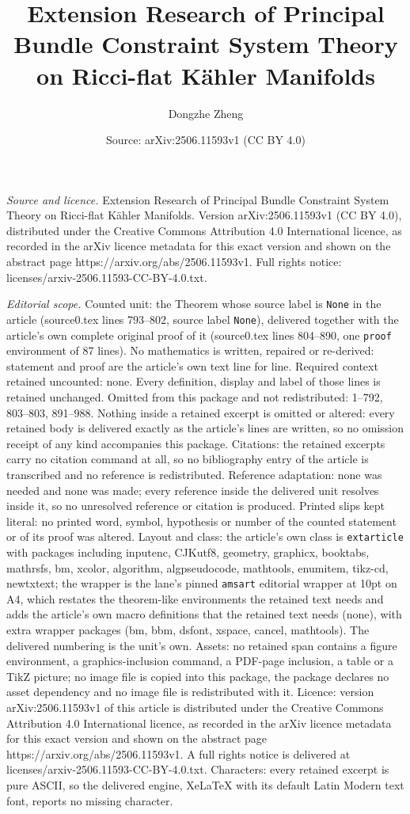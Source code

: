 \documentclass[10pt,a4paper]{amsart}
\title[Extension Research of Principal Bundle Constraint System The]{Extension Research of Principal Bundle Constraint System Theory on Ricci-flat K\"ahler Manifolds}
\author{Dongzhe Zheng}
\date{Source: arXiv:2506.11593v1 (CC BY 4.0)}
\begin{document}
\maketitle

\noindent\emph{Source and licence.} Extension Research of Principal Bundle Constraint System Theory on Ricci-flat K\"ahler Manifolds. Version arXiv:2506.11593v1 (CC BY 4.0), distributed under the Creative Commons Attribution 4.0 International licence, as recorded in the arXiv licence metadata for this exact version and shown on the abstract page https://arxiv.org/abs/2506.11593v1. Full rights notice: licenses/arxiv-2506.11593-CC-BY-4.0.txt.\par\smallskip

\noindent\textit{Editorial scope.} Counted unit: the Theorem whose source label is \texttt{None} in the article (source0.tex lines 793--802, source label \texttt{None}), delivered together with the article's own complete original proof of it (source0.tex lines 804--890, one \texttt{proof} environment of 87 lines). No mathematics is written, repaired or re-derived: statement and proof are the article's own text line for line. Required context retained uncounted: none. Every definition, display and label of those lines is retained unchanged. Omitted from this package and not redistributed: 1--792, 803--803, 891--988. Nothing inside a retained excerpt is omitted or altered: every retained body is delivered exactly as the article's lines are written, so no omission receipt of any kind accompanies this package. Citations: the retained excerpts carry no citation command at all, so no bibliography entry of the article is transcribed and no reference is redistributed. Reference adaptation: none was needed and none was made; every reference inside the delivered unit resolves inside it, so no unresolved reference or citation is produced. Printed slips kept literal: no printed word, symbol, hypothesis or number of the counted statement or of its proof was altered. Layout and class: the article's own class is \texttt{extarticle} with packages including inputenc, CJKutf8, geometry, graphicx, booktabs, mathrsfs, bm, xcolor, algorithm, algpseudocode, mathtools, enumitem, tikz-cd, newtxtext; the wrapper is the lane's pinned \texttt{amsart} editorial wrapper at 10pt on A4, which restates the theorem-like environments the retained text needs and adds the article's own macro definitions that the retained text needs (none), with extra wrapper packages (bm, bbm, dsfont, xspace, cancel, mathtools). The delivered numbering is the unit's own. Assets: no retained span contains a figure environment, a graphics-inclusion command, a PDF-page inclusion, a table or a TikZ picture; no image file is copied into this package, the package declares no asset dependency and no image file is redistributed with it. Licence: version arXiv:2506.11593v1 of this article is distributed under the Creative Commons Attribution 4.0 International licence, as recorded in the arXiv licence metadata for this exact version and shown on the abstract page https://arxiv.org/abs/2506.11593v1. A full rights notice is delivered at licenses/arxiv-2506.11593-CC-BY-4.0.txt. Characters: every retained excerpt is pure ASCII, so the delivered engine, XeLaTeX with its default Latin Modern text font, reports no missing character.
\end{document}
